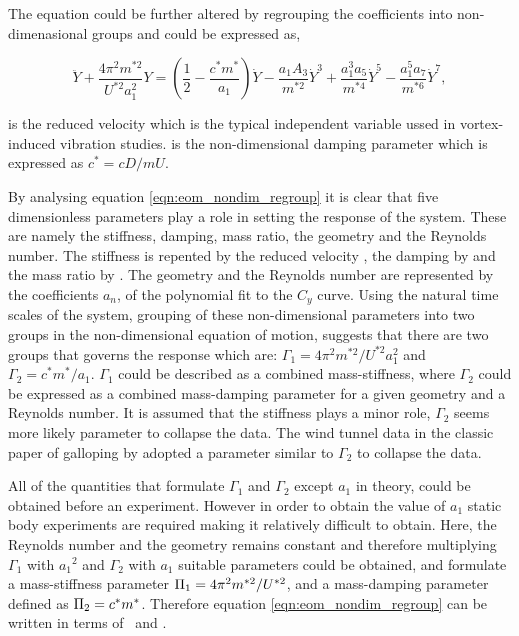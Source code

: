  The equation could be further altered by regrouping the coefficients into non-dimenasional groups and could be expressed as, 
 
  \begin{equation}
  \label{eqn:eom_nondim_regroup}
  \ddot{Y} + \frac{4\pi^{2}m^{*2}}{U^{*2}a_1^2}Y = \left(\frac{1}{2} - \frac{c^*m^*}{a_1}\right)\dot{Y} - \frac{a_1A_3}{m^{*2}}\dot{Y}^3 + \frac{a_1^3a_5}{m^{*4}}\dot{Y}^5 - \frac{a_1^5a_7}{m^{*6}}\dot{Y}^7,
  \end{equation}  

\ustar is the reduced velocity which is the typical independent variable ussed in vortex-induced vibration studies. \cstar is the non-dimensional damping parameter which is expressed as $c^*=cD/mU$. 

By analysing equation \ref{eqn:eom_nondim_regroup} it is clear that five dimensionless parameters play a role in setting the response of the system. These are namely the stiffness, damping, mass ratio, the geometry and the Reynolds number. The stiffness is repented by the reduced velocity \ustar, the damping by \cstar and the mass ratio by \mstar. The geometry and the Reynolds number are represented by the coefficients $a_n$, of the polynomial fit to the $C_y$ curve. Using the natural time scales of the system, grouping of these non-dimensional parameters into two groups in the non-dimensional equation of motion, suggests that there are two groups that governs the response which are: $\Gamma_1 = 4\pi^2m^{*2}/U^{*2}a_1^2$ and $\Gamma_2 = c^*m^*/a_1$. $\Gamma_1$ could be described as a combined mass-stiffness, where $\Gamma_2$ could be expressed as a combined mass-damping parameter for a given geometry and a Reynolds number. It is assumed that the stiffness plays a minor role, $\Gamma_2$ seems more likely parameter to collapse the data. The wind tunnel data in the classic paper of galloping by \citep{Parkinson1964} adopted a parameter similar to $\Gamma_2$ to collapse the data. 

All of the quantities that formulate $\Gamma_1$ and $\Gamma_2$ except $a_1$ in theory, could be obtained before an experiment. However in order to obtain the value of $a_1$ static body experiments are required making it relatively difficult to obtain. Here, the Reynolds number and the geometry remains constant and therefore multiplying $\Gamma_1$ with ${a_1}^2$ and $\Gamma_2$ with $a_1$ suitable parameters could be obtained, and formulate a mass-stiffness parameter $\Pi_1 =  4\pi^2m^{*2}/U^{*2}$, and a mass-damping parameter defined as $\Pi_2 = c^*m^*$. Therefore equation \ref{eqn:eom_nondim_regroup} can be written in terms of \massstiff \ and \massdamp. 


